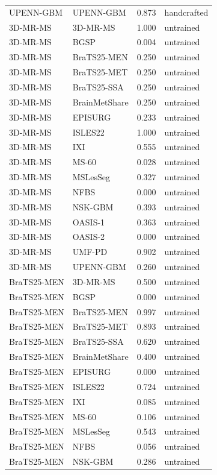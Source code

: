 \begin{tabular}{llrl}
UPENN-GBM & UPENN-GBM & 0.873 & handcrafted \\
3D-MR-MS & 3D-MR-MS & 1.000 & untrained \\
3D-MR-MS & BGSP & 0.004 & untrained \\
3D-MR-MS & BraTS25-MEN & 0.250 & untrained \\
3D-MR-MS & BraTS25-MET & 0.250 & untrained \\
3D-MR-MS & BraTS25-SSA & 0.250 & untrained \\
3D-MR-MS & BrainMetShare & 0.250 & untrained \\
3D-MR-MS & EPISURG & 0.233 & untrained \\
3D-MR-MS & ISLES22 & 1.000 & untrained \\
3D-MR-MS & IXI & 0.555 & untrained \\
3D-MR-MS & MS-60 & 0.028 & untrained \\
3D-MR-MS & MSLesSeg & 0.327 & untrained \\
3D-MR-MS & NFBS & 0.000 & untrained \\
3D-MR-MS & NSK-GBM & 0.393 & untrained \\
3D-MR-MS & OASIS-1 & 0.363 & untrained \\
3D-MR-MS & OASIS-2 & 0.000 & untrained \\
3D-MR-MS & UMF-PD & 0.902 & untrained \\
3D-MR-MS & UPENN-GBM & 0.260 & untrained \\
BraTS25-MEN & 3D-MR-MS & 0.500 & untrained \\
BraTS25-MEN & BGSP & 0.000 & untrained \\
BraTS25-MEN & BraTS25-MEN & 0.997 & untrained \\
BraTS25-MEN & BraTS25-MET & 0.893 & untrained \\
BraTS25-MEN & BraTS25-SSA & 0.620 & untrained \\
BraTS25-MEN & BrainMetShare & 0.400 & untrained \\
BraTS25-MEN & EPISURG & 0.000 & untrained \\
BraTS25-MEN & ISLES22 & 0.724 & untrained \\
BraTS25-MEN & IXI & 0.085 & untrained \\
BraTS25-MEN & MS-60 & 0.106 & untrained \\
BraTS25-MEN & MSLesSeg & 0.543 & untrained \\
BraTS25-MEN & NFBS & 0.056 & untrained \\
BraTS25-MEN & NSK-GBM & 0.286 & untrained \\

\end{tabular}
